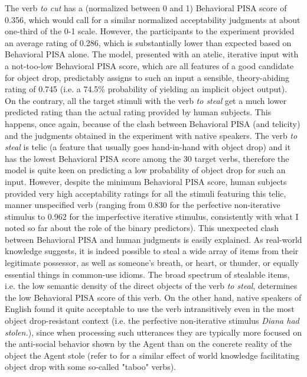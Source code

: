 The verb \textit{to cut} has a (normalized between 0 and 1) Behavioral PISA score of 0.356, which would call for a similar normalized acceptability judgments at about one-third of the 0-1 scale. However, the participants to the experiment provided an average rating of 0.286, which is substantially lower than expected based on Behavioral PISA alone. The model, presented with an atelic, iterative input with a not-too-low Behavioral PISA score, which are all features of a good candidate for object drop, predictably assigns to such an input a sensible, theory-abiding rating of 0.745 (i.e. a 74.5\% probability of yielding an implicit object output).\\
On the contrary, all the target stimuli with the verb \textit{to steal} get a much lower predicted rating than the actual rating provided by human subjects. This happens, once again, because of the clash between Behavioral PISA (and telicity) and the judgments obtained in the experiment with native speakers. The verb \textit{to steal} is telic (a feature that usually goes hand-in-hand with object drop) and it has the lowest Behavioral PISA score among the 30 target verbs, therefore the model is quite keen on predicting a low probability of object drop for such an input. However, despite the minimum Behavioral PISA score, human subjects provided very high acceptability ratings for all the stimuli featuring this telic, manner unspecified verb (ranging from 0.830 for the perfective non-iterative stimulus to 0.962 for the imperfective iterative stimulus, consistently with what I noted so far about the role of the binary predictors). This unexpected clash between Behavioral PISA and human judgments is easily explained. As real-world knowledge suggests, it is indeed possible to steal a wide array of items from their legitimate possessor, as well as someone's breath, or heart, or thunder, or equally essential things in common-use idioms. The broad spectrum of stealable items, i.e. the low semantic density of the direct objects of the verb \textit{to steal}, determines the low Behavioral PISA score of this verb. On the other hand, native speakers of English found it quite acceptable to use the verb intransitively even in the most object drop-resistant context (i.e. the perfective non-iterative stimulus \textit{Diana had stolen.}), since when processing such utterances they are typically more focused on the anti-social behavior shown by the Agent than on the concrete reality of the object the Agent stole (refer to \textcite[27-28]{Goldberg2005} for a similar effect of world knowledge facilitating object drop with some so-called "taboo" verbs). 


